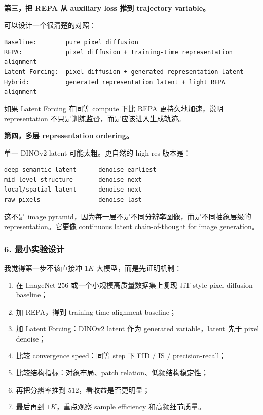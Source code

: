 \textbf{第三，把 REPA 从 auxiliary loss 推到 trajectory variable。}

可以设计一个很清楚的对照：
\begin{lstlisting}[language={},basicstyle=\ttfamily\small]
Baseline:        pure pixel diffusion
REPA:            pixel diffusion + training-time representation alignment
Latent Forcing:  pixel diffusion + generated representation latent
Hybrid:          generated representation latent + light REPA alignment
\end{lstlisting}

如果 Latent Forcing 在同等 compute 下比 REPA 更持久地加速，说明 representation 不只是训练监督，而是应该进入生成轨迹。

\textbf{第四，多层 representation ordering。}

单一 DINOv2 latent 可能太粗。更自然的 high-res 版本是：
\begin{lstlisting}[language={},basicstyle=\ttfamily\small]
deep semantic latent      denoise earliest
mid-level structure       denoise next
local/spatial latent      denoise next
raw pixels                denoise last
\end{lstlisting}

这不是 image pyramid，因为每一层不是不同分辨率图像，而是不同抽象层级的 representation。它更像 continuous latent chain-of-thought for image generation。

\subsubsection*{6. 最小实验设计}

我觉得第一步不该直接冲 $1K$ 大模型，而是先证明机制：

\begin{enumerate}[leftmargin=1.8em]
  \item 在 ImageNet $256$ 或一个小规模高质量数据集上复现 JiT-style pixel diffusion baseline；
  \item 加 REPA，得到 training-time alignment baseline；
  \item 加 Latent Forcing：DINOv2 latent 作为 generated variable，latent 先于 pixel denoise；
  \item 比较 convergence speed：同等 step 下 FID / IS / precision-recall；
  \item 比较结构指标：对象布局、patch relation、低频结构稳定性；
  \item 再把分辨率推到 $512$，看收益是否更明显；
  \item 最后再到 $1K$，重点观察 sample efficiency 和高频细节质量。
\end{enumerate}

